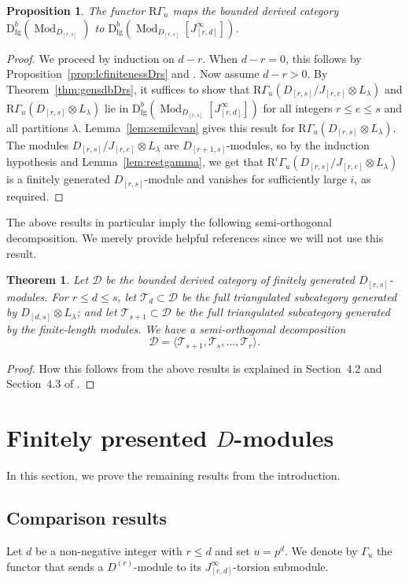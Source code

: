 \documentclass[12pt]{amsart}
\newcommand{\cD}{\mathcal{D}}
\newcommand{\rD}{\mathrm{D}}
\newcommand{\rR}{\mathrm{R}}
\newcommand{\cT}{\mathcal{T}}
\DeclareMathOperator{\Mod}{Mod}
\DeclareMathOperator{\fgen}{fg}
\newcommand{\Dr}{D^{(r)}}
\newcommand{\Drs}{D_{[r,s]}}
\newcommand{\Jrd}{J_{[r,d]}}
\newcommand{\mGau}{\Gamma_{u}}
\numberwithin{equation}{section}
\newtheorem{theorem}[equation]{Theorem}
\newtheorem{proposition}[equation]{Proposition}
\theoremstyle{definition}
\theoremstyle{plain}
\begin{document}
 \begin{proposition}\label{prop:lcgauDrs}
 The functor $\rR\mGau$ maps the bounded derived category $\rD^b_{\fgen}(\Mod_{\Drs})$ to $\rD^b_{\fgen}(\Mod_{\Drs}[\Jrd^{\infty}])$.
 \end{proposition}
 \begin{proof}
 We proceed by induction on $d - r$. When $d - r = 0$, this follows by  Proposition~\ref{prop:lcfinitenessDrs} and \cite[Lemma~6.5]{gan25pol}. Now assume $d - r > 0$.  By Theorem~\ref{thm:gensdbDrs}, it suffices to show that $\rR \mGau(\Drs/J_{[r,e]} \otimes L_{\lambda})$ and $\rR \mGau(\Drs \otimes L_{\lambda})$ lie in $\rD^b_{\fgen}(\Mod_{\Drs}[\Jrd^{\infty}])$ for all integers $r \leq e \leq s$ and all partitions $\lambda$. Lemma~\ref{lem:semilcvan} gives this result for $\rR \mGau(\Drs \otimes L_{\lambda})$. The modules $\Drs/J_{[r,e]} \otimes L_{\lambda}$ are $D_{[r+1, s]}$-modules, so by the induction hypothesis and Lemma~\ref{lem:restgamma}, we get that $\rR^i\mGau(\Drs/J_{[r,e]} \otimes L_{\lambda})$ is a finitely generated $\Drs$-module and vanishes for sufficiently large $i$, as required.
 \end{proof}

The above results in particular imply the following semi-orthogonal decomposition. We merely provide helpful references since we will not use this result.

\begin{theorem}\label{thm:sodDrs} 
Let $\cD$ be the bounded derived category of finitely generated $\Drs$-modules. For $r \leq d \leq s$, let $\cT_d \subset \cD$ be the full triangulated subcategory generated by $D_{[d, s]} \otimes L_{\lambda}$; and let $\cT_{s+1} \subset \cD$ be the full triangulated subcategory generated by the finite-length modules. We have a semi-orthogonal decomposition
   \[
   \cD = \langle \cT_{s+1}, \cT_s, \ldots, \cT_r \rangle.
   \]
\end{theorem}
\begin{proof}
    How this follows from the above results is explained in Section~4.2 and Section~4.3 of \cite{ss19gl2}. 
\end{proof}


\section{Finitely presented \texorpdfstring{$D$}{D}-modules}\label{s:fpd}
In this section, we prove the remaining results from the introduction.
\subsection{Comparison results}\label{ss:comparison}
Let $d$ be a non-negative integer with $r \leq d$  and set $u = p^d$. We denote by $\mGau$ the functor that sends a $\Dr$-module to its $J_{[r,d]}^{\infty}$-torsion submodule.
\end{document}
